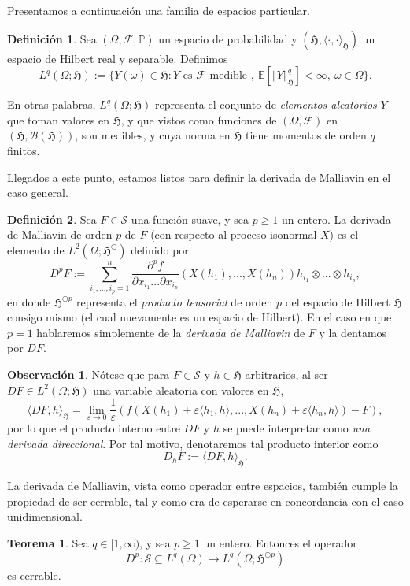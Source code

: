 \documentclass[letterpaper,twoside,12pt]{book}
\newcommand{\F}{\mathcal{F}}
\newcommand{\B}{\mathcal{B}}
\renewcommand{\S}{\mathcal{S}}
\newcommand{\E}{\mathbb{E}}
\renewcommand{\P}{\mathbb{P}}
\newcommand{\1}{\mathds{1}}
\renewcommand{\to}{\rightarrow}
\newcommand{\norm}[1]{\left\Vert #1 \right\Vert}
\theoremstyle{definition}
\newtheorem{dfn}{Definición}
\theoremstyle{definition}
\newtheorem{teo}{Teorema}
\theoremstyle{remark}
\theoremstyle{definition}
\theoremstyle{definition}
\theoremstyle{definition}
\newtheorem{obs}{Observación}
\theoremstyle{definition}
\theoremstyle{definition}
\begin{document}
Presentamos a continuación una familia de espacios particular.

\begin{dfn} 
 Sea $(\Omega, \F, \P)$ un espacio de probabilidad y $(\mathfrak{H},\langle \cdot,\cdot\rangle_{\mathfrak{H}})$ un espacio de Hilbert real y separable. Definimos 
 \[
 L^q(\Omega;\mathfrak{H}):=\{Y(\omega)\in \mathfrak{H}:Y \text{ es }\F \text{-medible },\ \E\left[\norm{Y}_{\mathfrak{H}}^q\right]<\infty, \ \omega \in \Omega\}.
 \]
 \end{dfn}
 En otras palabras, $L^q(\Omega;\mathfrak{H})$ representa el conjunto de \textit{elementos aleatorios} $Y$ que toman valores en $\mathfrak{H}$, y que vistos como funciones de $(\Omega,\F)$ en $(\mathfrak{H},\B(\mathfrak{H}))$, son medibles, y cuya norma en $\mathfrak{H}$ tiene momentos de orden $q$ finitos. 

Llegados a este punto, estamos listos para definir la derivada de Malliavin en el caso general.
\begin{dfn} 
 Sea $F\in \S$ una función suave, y sea $p\geq1$ un entero. La derivada de Malliavin de orden $p$ de $F$ (con respecto al proceso isonormal $X$) es el elemento de $L^2(\Omega;\mathfrak{H}^{\odot})$ definido por 
 \[
 D^pF:=\sum_{i_1,...,i_p=1}^{n}\frac{\partial^pf}{\partial x_{i_1}...\partial x_{i_p}}(X(h_1),...,X(h_n))h_{i_1}\otimes...\otimes h_{i_p},
 \] 
 en donde $\mathfrak{H}^{\odot p}$ representa el \textit{producto tensorial} de orden $p$ del espacio de Hilbert $\mathfrak{H}$ consigo mismo (el cual nuevamente es un espacio de Hilbert). En el caso en que $p=1$ hablaremos simplemente de la \textit{derivada de Malliavin} de $F$ y la dentamos por $DF$.
 \end{dfn}
 \begin{obs}
   Nótese que para $F\in \S$ y $h\in \mathfrak{H}$ arbitrarios, al ser $DF\in L^2(\Omega;\mathfrak{H})$ una variable aleatoria con valores en $\mathfrak{H}$, 
   \[
   \langle DF,h\rangle_{\mathfrak{H}}=\lim_{\varepsilon\to 0} \frac{1}{\varepsilon}\left(f(X(h_1)+\varepsilon \langle h_1,h\rangle,...,X(h_n)+\varepsilon \langle h_n,h\rangle)-F\right),
   \]
   por lo que el producto interno entre $DF$ y $h$ se puede interpretar como \textit{una derivada direccional}. Por tal motivo, denotaremos tal producto interior como  
   \[
   D_hF:=\langle DF,h\rangle_{\mathfrak{H}}.
   \]
 \end{obs}
 La derivada de Malliavin, vista como operador entre espacios, también cumple la propiedad de ser cerrable, tal y como era de esperarse en concordancia con el caso unidimensional.
 \begin{teo} 
  Sea $q\in [1,\infty)$, y sea $p\geq 1$ un entero. Entonces el operador 
  \[
  D^{p}:\S\subseteq L^q(\Omega)\to L^q(\Omega;\mathfrak{H}^{\odot p})
  \]
  es cerrable.
  \end{teo}
\end{document}
